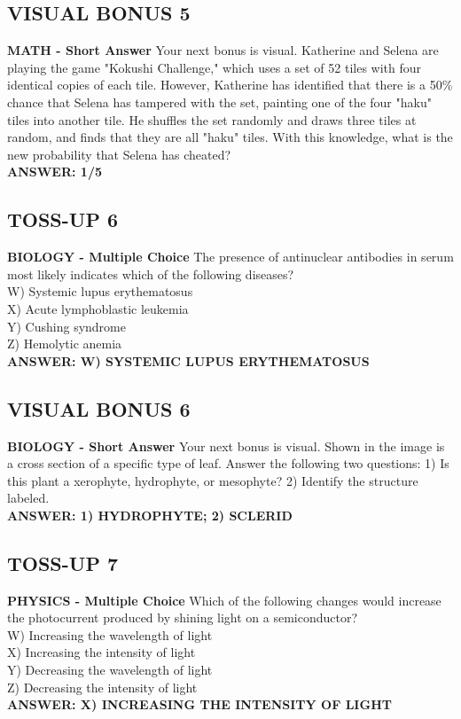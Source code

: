 \documentclass{article}
\begin{document}
\subsection*{VISUAL BONUS 5}
\textbf{MATH - Short Answer} Your next bonus is visual. Katherine and Selena are playing the game "Kokushi Challenge," which uses a set of 52 tiles with four identical copies of each tile. However, Katherine has identified that there is a 50\% chance that Selena has tampered with the set, painting one of the four "haku" tiles into another tile. He shuffles the set randomly and draws three tiles at random, and finds that they are all "haku" tiles. With this knowledge, what is the new probability that Selena has cheated? \\
\textbf{ANSWER: 1/5}

\subsection*{TOSS-UP 6}
\textbf{BIOLOGY - Multiple Choice} The presence of antinuclear antibodies in serum most likely indicates which of the following diseases? \\
W) Systemic lupus erythematosus \\
X) Acute lymphoblastic leukemia \\
Y) Cushing syndrome \\
Z) Hemolytic anemia \\
\textbf{ANSWER: W) SYSTEMIC LUPUS ERYTHEMATOSUS}

\subsection*{VISUAL BONUS 6}
\textbf{BIOLOGY - Short Answer} Your next bonus is visual. Shown in the image is a cross section of a specific type of leaf. Answer the following two questions:
1) Is this plant a xerophyte, hydrophyte, or mesophyte?
2) Identify the structure labeled. \\
\textbf{ANSWER: 1) HYDROPHYTE; 2) SCLERID}

\subsection*{TOSS-UP 7}
\textbf{PHYSICS - Multiple Choice} Which of the following changes would increase the photocurrent produced by shining light on a semiconductor? \\
W) Increasing the wavelength of light \\
X) Increasing the intensity of light \\
Y) Decreasing the wavelength of light \\
Z) Decreasing the intensity of light \\
\textbf{ANSWER: X) INCREASING THE INTENSITY OF LIGHT}
\end{document}
